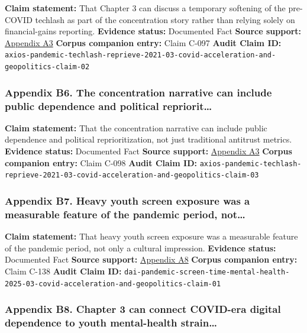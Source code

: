 \documentclass[
  american,
  11pt,
  letterpaper,
]{article}
\begin{document}
\textbf{Claim statement:} That Chapter 3 can discuss a temporary
softening of the pre-COVID techlash as part of the concentration story
rather than relying solely on financial-gains reporting.
\textbf{Evidence status:} Documented Fact \textbf{Source support:}
\hyperref[appendix-a3-pandemic-provides-a-techlash-reprieve]{Appendix
A3} \textbf{Corpus companion entry:} Claim C-097 \textbf{Audit Claim
ID:}
\texttt{axios-pandemic-techlash-reprieve-2021-03-covid-acceleration-and-geopolitics-claim-02}

\subsubsection{Appendix B6. The concentration narrative can include
public dependence and political
repriorit\ldots{}}\label{appendix-b6-the-concentration-narrative-can-include-public-dependence-and-political-repriorit}

\textbf{Claim statement:} That the concentration narrative can include
public dependence and political reprioritization, not just traditional
antitrust metrics. \textbf{Evidence status:} Documented Fact
\textbf{Source support:}
\hyperref[appendix-a3-pandemic-provides-a-techlash-reprieve]{Appendix
A3} \textbf{Corpus companion entry:} Claim C-098 \textbf{Audit Claim
ID:}
\texttt{axios-pandemic-techlash-reprieve-2021-03-covid-acceleration-and-geopolitics-claim-03}

\subsubsection{Appendix B7. Heavy youth screen exposure was a measurable
feature of the pandemic period,
not\ldots{}}\label{appendix-b7-heavy-youth-screen-exposure-was-a-measurable-feature-of-the-pandemic-period-not}

\textbf{Claim statement:} That heavy youth screen exposure was a
measurable feature of the pandemic period, not only a cultural
impression. \textbf{Evidence status:} Documented Fact \textbf{Source
support:}
\hyperref[appendix-a8-excessive-screen-time-is-associated-with-mental-health-problems-and-adhd-in-us-children-and-adolescents-physical-activity-and-sleep-as-parallel-mediators]{Appendix
A8} \textbf{Corpus companion entry:} Claim C-138 \textbf{Audit Claim
ID:}
\texttt{dai-pandemic-screen-time-mental-health-2025-03-covid-acceleration-and-geopolitics-claim-01}

\subsubsection{Appendix B8. Chapter 3 can connect COVID-era digital
dependence to youth mental-health
strain\ldots{}}\label{appendix-b8-chapter-3-can-connect-covid-era-digital-dependence-to-youth-mental-health-strain}
\end{document}
